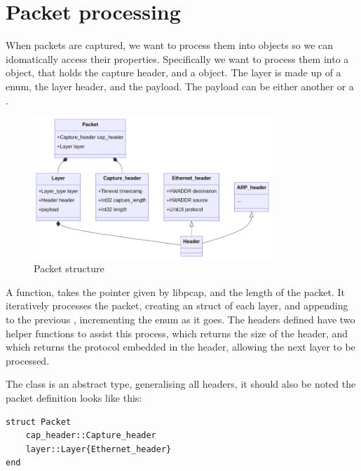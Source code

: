 \section{Packet processing}

When packets are captured, we want to process them into objects so we can idomatically access their properties. Specifically we want to process them into a  object, that holds the capture header, and a  object. The layer is made up of a  enum, the layer header, and the payload. The payload can be either another  or a .

\begin{figure}[!h]
    \centering
    \includegraphics[width=0.8\textwidth]{fig/packet_structure.png}
    \caption{Packet structure}
    \label{fig:packet_structure}
\end{figure}

A function,  takes the pointer given by libpcap, and the length of the packet. It iteratively processes the packet, creating an  struct of each layer, and appending to the previous , incrementing the  enum as it goes. The headers defined have two helper functions to assist this process,  which returns the size of the header, and  which returns the protocol embedded in the header, allowing the next layer to be processed.

The  class is an abstract type, generalising all headers, it should also be noted the packet definition looks like this:

\begin{lstlisting}[language=JuliaLocal, style=julia]
struct Packet
    cap_header::Capture_header
    layer::Layer{Ethernet_header}
end
\end{lstlisting}

